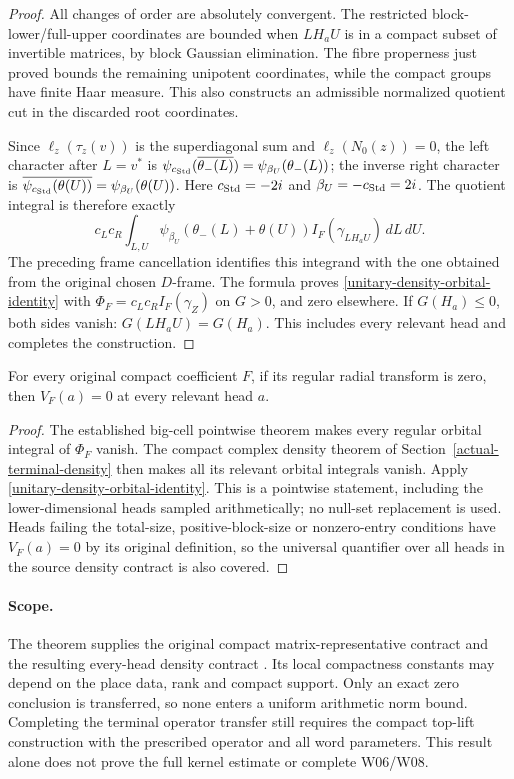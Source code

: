 \begin{proof}
All changes of order are absolutely convergent.  The
restricted block-lower/full-upper coordinates are bounded
when $LH_aU$ is in a compact subset of invertible matrices,
by block Gaussian elimination.  The fibre properness just
proved bounds the remaining unipotent coordinates, while
the compact groups have finite Haar measure.  This also
constructs an admissible normalized quotient cut in the
discarded root coordinates.

Since $\ell_z(\tau_z(v))$ is the superdiagonal sum and
$\ell_z(N_0(z))=0$, the left character after $L=v^*$ is
$\psi_{c_{\rm Std}}(\overline{\theta_-(L)})
=\psi_{\beta_U}(\theta_-(L))$; the inverse right character
is $\overline{\psi_{c_{\rm Std}}(\theta(U))}
=\psi_{\beta_U}(\theta(U))$.
Here $c_{\rm Std}=-2i$ and $\beta_U=-c_{\rm Std}=2i$.
The quotient integral is therefore exactly
\[
 c_Lc_R\int_{L,U}
       \psi_{\beta_U}(\theta_-(L)+\theta(U))
              I_F(\gamma_{LH_aU})\,dL\,dU.
\]
The preceding frame cancellation identifies this integrand
with the one obtained from the original chosen $D$-frame.
The formula proves \eqref{unitary-density-orbital-identity}
with $\Phi_F=c_Lc_R I_F(\gamma_Z)$ on $G>0$, and zero
elsewhere.  If $G(H_a)\le0$, both sides vanish: $G(LH_aU)=G(H_a)$.
This includes every relevant head and completes the construction.
\end{proof}

\begin{corollary}\label{unitary-density-every-head}
For every original compact coefficient $F$, if its regular
radial transform is zero, then $V_F(a)=0$ at every relevant
head $a$.
\end{corollary}

\begin{proof}
The established big-cell pointwise theorem makes every regular
orbital integral of $\Phi_F$ vanish.  The compact complex density
theorem of Section~\ref{actual-terminal-density} then makes all
its relevant orbital integrals vanish.  Apply
\eqref{unitary-density-orbital-identity}.  This is a pointwise
statement, including the lower-dimensional heads sampled
arithmetically; no null-set replacement is used.
Heads failing the total-size, positive-block-size or nonzero-entry
conditions have $V_F(a)=0$ by its original definition, so the
universal quantifier over all heads in the source density contract
is also covered.
\end{proof}

\paragraph{Scope.}
The theorem supplies the original compact matrix-representative
contract and the resulting every-head density contract
\cite{unitary-density-source}.  Its local compactness constants
may depend on the place data, rank and compact support.  Only
an exact zero conclusion is transferred, so none enters a
uniform arithmetic norm bound.  Completing the terminal
operator transfer still requires the compact top-lift
construction with the prescribed operator and all word
parameters.  This result alone does not prove the full kernel
estimate or complete W06/W08.
